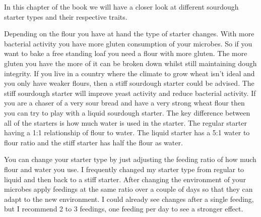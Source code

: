 In this chapter of the book we will have a closer look
at different sourdough starter types and their respective
traits.

\begin{table}[htp!]
\centering
{}
\caption{\label{tab:starter-types-comparison}A comparison of different sourdough starter types}
\end{table}

Depending on the flour you have at hand the type of starter changes. With more
bacterial activity you have more gluten consumption of your microbes. So if
you want to bake a free standing loaf you need a flour with more gluten. The
more gluten you have the more of it can be broken down whilst still maintaining
dough integrity. If you live in a country where the climate to grow wheat
isn't ideal and you only have weaker flours, then a stiff sourdough starter
could be advised. The stiff sourdough starter will improve yeast activity and
reduce bacterial activity. If you are a chaser of a very sour bread and have a
very strong wheat flour then you can try to play with a liquid sourdough
starter. The key difference between all of the starters is how much water
is used in the starter. The regular starter having a 1:1 relationship of flour
to water. The liquid starter has a 5:1 water to flour ratio and the stiff
starter has half the flour as water.

You can change your starter type by just adjusting the feeding ratio of how
much flour and water you use. I frequently changed my starter type from
regular to liquid and then back to a stiff starter. After changing the
environment of your microbes apply feedings at the same ratio over a couple of
days so that they can adapt to the new environment. I could already see
changes after a single feeding, but I recommend 2 to 3 feedings, one feeding per
day to see a stronger effect.

